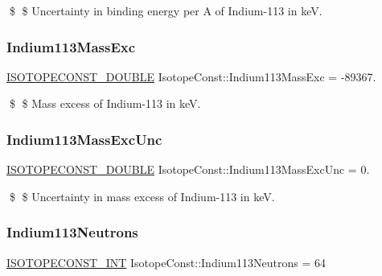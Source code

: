 \$ \$ Uncertainty in binding energy per A of Indium-\/113 in keV. \mbox{\label{group___isotope_const-_indium-_in113_ga9761b9c778cec23b5ffcacc778f26d6d}} 
\subsubsection{\texorpdfstring{Indium113\+Mass\+Exc}{Indium113MassExc}}
{\footnotesize\ttfamily \mbox{\hyperlink{group___isotope_const-_macros_ga8f45a7272ce02c0b4c65c44636ed719a}{I\+S\+O\+T\+O\+P\+E\+C\+O\+N\+S\+T\+\_\+\+D\+O\+U\+B\+LE}} Isotope\+Const\+::\+Indium113\+Mass\+Exc = -\/89367.}

\$ \$ Mass excess of Indium-\/113 in keV. \mbox{\label{group___isotope_const-_indium-_in113_ga05c43a0b240f5efff5fc92888e078897}} 
\subsubsection{\texorpdfstring{Indium113\+Mass\+Exc\+Unc}{Indium113MassExcUnc}}
{\footnotesize\ttfamily \mbox{\hyperlink{group___isotope_const-_macros_ga8f45a7272ce02c0b4c65c44636ed719a}{I\+S\+O\+T\+O\+P\+E\+C\+O\+N\+S\+T\+\_\+\+D\+O\+U\+B\+LE}} Isotope\+Const\+::\+Indium113\+Mass\+Exc\+Unc = 0.}

\$ \$ Uncertainty in mass excess of Indium-\/113 in keV. \mbox{\label{group___isotope_const-_indium-_in113_ga489ece1abdcfab0951ca6ba64ebc5abb}} 
\subsubsection{\texorpdfstring{Indium113\+Neutrons}{Indium113Neutrons}}
{\footnotesize\ttfamily \mbox{\hyperlink{group___isotope_const-_macros_ga5f18360b3e99483a35c32d789e62621c}{I\+S\+O\+T\+O\+P\+E\+C\+O\+N\+S\+T\+\_\+\+I\+NT}} Isotope\+Const\+::\+Indium113\+Neutrons = 64}

